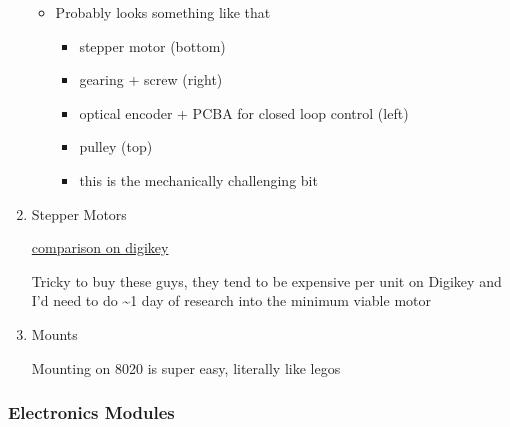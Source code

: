 \documentclass[11pt]{article}
\begin{document}
\begin{enumerate}
\begin{itemize}
\item Probably looks something like that
\begin{itemize}
\item stepper motor (bottom)
\item gearing + screw (right)
\item optical encoder + PCBA for closed loop control (left)
\item pulley (top)
\item this is the mechanically challenging bit
\end{itemize}
\end{itemize}

\item Stepper Motors
\label{sec:orge0ea1b9}

\href{https://www.digikey.com/en/products/compare?s=N4IgzCBcDaIEwBYCMB2ADHArCANCBAHAmAlriJgJyWZoqXkBsmBBmKKIAunglCAHoApgDsBABwBOAewAmAVwDGAFwDOAgGYBLADbKhkgav3jxBgLQBbacumT1qSgH5VAXgByCAJIBzAFYAwgBCitIAogAeSNIAIgDiAKpBlkExAILuPgBaAO4A0gCaQdIAikEoeWkARgBKQT4AEgVFlmFplmkAaj5pWQCGAWkA8gCyGX7iAdLiBNKKJWkAGiVeaQ1pAZglC1klANZpImkAUgVpKMMFPQBuPgAqaUFD7n6lABZ7e7LuIhEAYgBlLzHLR5NA9ZQxMIABTify6YGhfy8WSCflk11k0i8NQWdz6d1UOWOPjeETyCR8JQaPgOdwAXmFFASSqosmk0O5ViAAL5AA}{comparison on digikey}

Tricky to buy these guys, they tend to be expensive per unit on Digikey and I'd need to do \textasciitilde{}1 day of research into the minimum viable motor

\item Mounts
\label{sec:org240b1cc}

Mounting on 8020 is super easy, literally like legos
\end{enumerate}

\subsubsection{Electronics Modules}
\label{sec:org1b61546}
\end{document}
